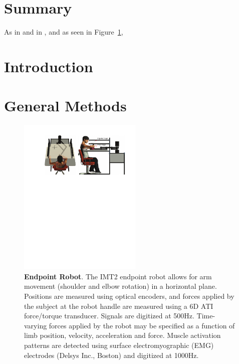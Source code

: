 \documentclass[12pt]{article}
\begin{document}
\section*{Summary}

As in \cite{mattar2005motor} and in \cite{hodgkin1952propagation},
and as seen in Figure~\ref{fig:robot}, \lipsum[1]

\begin{multicols}{2}
  
  \section*{Introduction}
  
  \lipsum[1-5]

  \section*{General Methods}

  \lipsum[1-5]
  
\end{multicols}

\newpage




\newpage
\clearpage
\begin{figure}[H]
	\centering
        \includegraphics[height=3in]{robot_imt.pdf}
        \caption{\textbf{Endpoint Robot}. The IMT2 endpoint robot
          allows for arm movement (shoulder and elbow rotation) in a
          horizontal plane. Positions are measured using optical
          encoders, and forces applied by the subject at the robot
          handle are measured using a 6D ATI force/torque
          transducer. Signals are digitized at 500Hz. Time-varying
          forces applied by the robot may be specified as a function
          of limb position, velocity, acceleration and force. Muscle
          activation patterns are detected using surface
          electromyographic (EMG) electrodes (Delsys Inc., Boston) and
          digitized at 1000Hz.}
 \label{fig:robot}
\end{figure}


\end{document}
